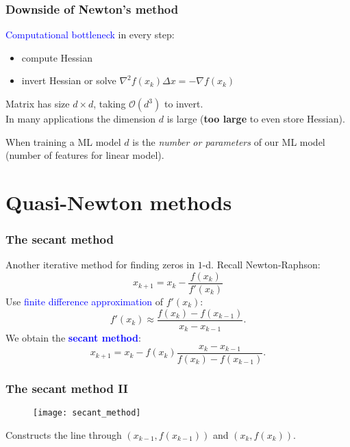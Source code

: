 \documentclass[aspectratio=149]{beamer}
\begin{document}
\begin{frame}
  \frametitle{Downside of Newton's method}
  \textcolor{blue}{Computational bottleneck} in every step:
  \begin{itemize}
    \item compute Hessian
    \item invert Hessian or solve $\nabla^2 f(x_k) \Delta x = - \nabla f(x_k)$
  \end{itemize}
  \vspace{1cm}
  Matrix has size $d\times d$, taking $\mathcal{O}(d^3)$ to invert.\\
  In many applications the dimension $d$ is large (\textbf{too large} to even store Hessian).

  \vspace{1cm}
  When training a ML model $d$ is the \textit{number or parameters} of our ML model (number of features for linear model).
\end{frame}


\section{Quasi-Newton methods}%

\begin{frame}
  \frametitle{The secant method}
  Another iterative method for finding zeros in $1$-d.
  Recall Newton-Raphson:
  \begin{equation}
    x_{k+1} = x_k - \frac{f(x_k)}{f'(x_k)}
  \end{equation}
  Use \textcolor{blue}{finite difference approximation} of $f'(x_k)$:
  \begin{equation}
    f'(x_k) \approx \frac{f(x_k) - f(x_{k-1})}{x_k - x_{k-1}}.
  \end{equation}
  We obtain the \textcolor{blue}{\textbf{secant method}}:
  \begin{equation}
    x_{k+1} = x_k - f(x_k) \frac{x_k - x_{k-1}}{f(x_k) - f(x_{k-1})}.
  \end{equation}

\end{frame}


\begin{frame}
  \frametitle{The secant method II}
  \begin{figure}[ht]
    \centering
    \texttt{[image: secant\_method]}
  \end{figure}
  Constructs the line through $(x_{k-1}, f(x_{k-1}))$ and $(x_k, f(x_k))$.
\end{frame}
\end{document}
